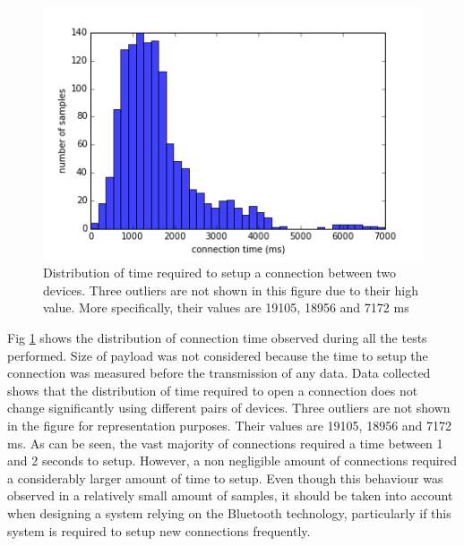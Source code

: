 \begin{figure}[ht!]
  \centering
  \includegraphics[width=1.0\textwidth]{application/img/setup_distribution.png}
  \caption{Distribution of time required to setup a connection between two devices. Three outliers are not shown in this figure due to their high value. More specifically, their values are 19105, 18956 and 7172 ms}
  \label{figure:conn_time_distribution}
\end{figure}

Fig \ref{figure:conn_time_distribution} shows the distribution of connection time observed during all the tests performed.
Size of payload was not considered because the time to setup the connection was measured before the transmission of any data. 
Data collected shows that the distribution of time required to open a connection does not change significantly using different pairs of devices.
Three outliers are not shown in the figure for representation purposes. Their values are 19105, 18956 and 7172 ms.
As can be seen, the vast majority of connections required a time between 1 and 2 seconds to setup.
However, a non negligible amount of connections required a considerably larger amount of time to setup.
Even though this behaviour was observed in a relatively small amount of samples, it should be taken into account when designing a system relying on the Bluetooth technology, particularly if this system is required to setup new connections frequently.